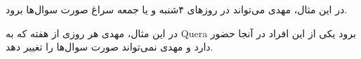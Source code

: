 \begin{problem}{}
    \Examples

    \Example

    \begin{example}
    \end{example}

    \Explanation
    در این مثال، مهدی می‌تواند در روزهای ۴شنبه و یا جمعه سراغ صورت سوال‌ها برود.

    \Example
    \begin{example}
    \end{example}
    \Explanation
    در این مثال، مهدی هر روزی از هفته که به Quera برود یکی از این افراد در آنجا حضور دارد و مهدی نمی‌تواند صورت سوال‌ها را تغییر دهد.


\end{problem}
